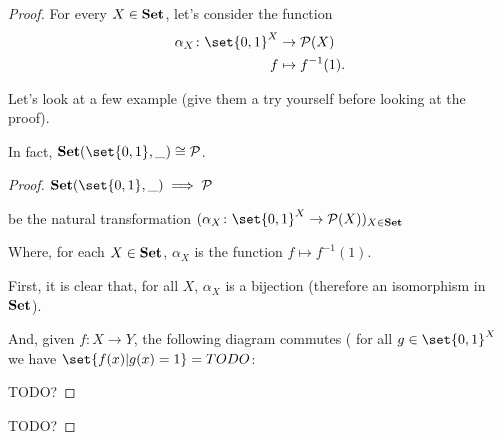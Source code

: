 \documentclass[a4paper]{article}
\theoremstyle { remark }
\theoremstyle { definition }
\theoremstyle { plain }
\begin{document}
\begin{proof}
For every \( X \in  \mathbf { Set }  \), let's consider the function
\begin{align*}
  \alpha_X \colon
    \set{0, 1}^X & \to \pset(X) \\
               f & \mapsto f^{-1}(1).
\end{align*}

Let's look at a few example (give them a try yourself before looking at the proof).

In fact, \( \Set(\set{0,1}, \_) \cong \pset \).

\begin{proof}
\( \Set(\set{0,1}, \_) \implies \pset \)

be the natural transformation \( (\alpha_X \colon \set{0,1}^X \to \pset(X))_{X \in \Set} \)

Where, for each \( X \in  \mathbf { Set }  \), \( \alpha_X \) is the function  \( f \mapsto f^{-1}(1) \).

First, it is clear that, for all \( X \), \( \alpha_X \) is a bijection (therefore an isomorphism in \(  \mathbf { Set }  \)).

And, given \( f \colon X \to Y \), the following diagram commutes (\ie{} for all \( g \in \set{0,1}^X \) we have \( \set{f(x) | g(x) = 1} = TODO \):

\begin{center}
\end{center}

\begin{center}
\end{center}

TODO?
\end{proof}

TODO?
\end{proof}
\end{document}
